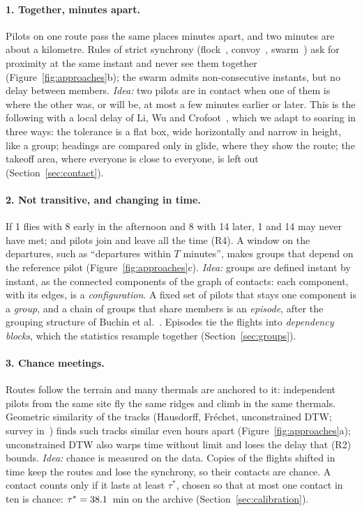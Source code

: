 \paragraph{1. Together, minutes apart.} Pilots on one route pass the same places minutes apart,
and two minutes are about a kilometre. Rules of strict synchrony (flock~\cite{gudmundsson2006},
convoy~\cite{jeung2008}, swarm~\cite{li2010}) ask for proximity at the same instant and never see
them together (Figure~\ref{fig:approaches}b); the swarm admits non-consecutive instants, but no
delay between members. \emph{Idea:} two pilots are in contact when one of them is where the other
was, or will be, at most a few minutes earlier or later. This is the following with a local delay
of Li, Wu and Crofoot~\cite{li2013}, which we adapt to soaring in three ways: the tolerance is a
flat box, wide horizontally and narrow in height, like a group; headings are compared only in
glide, where they show the route; the takeoff area, where everyone is close to everyone, is
left out (Section~\ref{sec:contact}).

\paragraph{2. Not transitive, and changing in time.} If 1 flies with 8 early in the afternoon and
8 with 14 later, 1 and 14 may never have met; and pilots join and leave all the time (R4). A
window on the departures, such as ``departures within $T$ minutes'', makes groups that depend on
the reference pilot (Figure~\ref{fig:approaches}c). \emph{Idea:} groups are defined instant by
instant, as the connected components of the graph of contacts: each component, with its edges,
is a \emph{configuration}. A fixed set of pilots that stays one component is a \emph{group},
and a chain of groups that share members is an \emph{episode}, after the grouping structure of Buchin et al.~\cite{buchin2015}. Episodes tie the
flights into \emph{dependency blocks}, which the statistics resample together
(Section~\ref{sec:groups}).

\paragraph{3. Chance meetings.} Routes follow the terrain and many thermals are anchored to it:
independent pilots from the same site fly the same ridges and climb in the same thermals.
Geometric similarity of the tracks (Hausdorff, Fréchet, unconstrained DTW; survey
in~\cite{su2020}) finds such tracks similar even hours apart (Figure~\ref{fig:approaches}a);
unconstrained DTW also warps time without limit and loses the delay that (R2) bounds.
\emph{Idea:} chance is measured on the data. Copies of the flights shifted in time keep the routes
and lose the synchrony, so their contacts are chance. A contact counts only if it lasts at least
$\tau^*$, chosen so that at most one contact in ten is chance: $\tau^*=38.1$~min on the
archive (Section~\ref{sec:calibration}).

